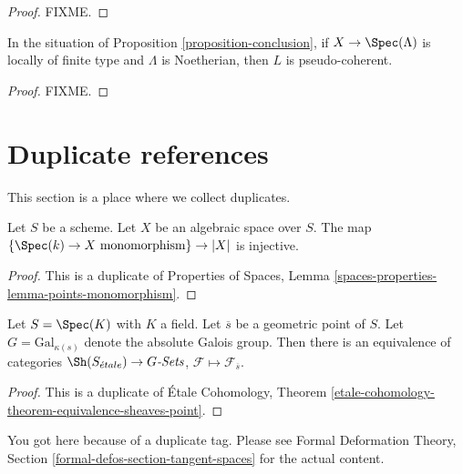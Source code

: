 \begin{proof}
FIXME.
\end{proof}

\begin{lemma}
\label{lemma-pseudo-coherent}
In the situation of Proposition \ref{proposition-conclusion}, if
$X \to \Spec(\Lambda)$ is locally of finite type and $\Lambda$ is Noetherian,
then $L$ is pseudo-coherent.
\end{lemma}

\begin{proof}
FIXME.
\end{proof}












\section{Duplicate references}
\label{section-duplicates}

\noindent
This section is a place where we collect duplicates.

\begin{lemma}
\label{lemma-points-monomorphism}
Let $S$ be a scheme. Let $X$ be an algebraic space over $S$.
The map $\{\Spec(k) \to X \text{ monomorphism}\} \to |X|$ is injective.
\end{lemma}

\begin{proof}
This is a duplicate of
Properties of Spaces, Lemma \ref{spaces-properties-lemma-points-monomorphism}.
\end{proof}

\begin{theorem}
\label{theorem-equivalence-sheaves-point}
Let $S = \Spec(K)$ with $K$ a field.
Let $\overline{s}$ be a geometric point of $S$.
Let $G = \text{Gal}_{\kappa(s)}$ denote the absolute Galois group.
Then there is an equivalence of categories
$\Sh(S_{\acute{e}tale}) \to G\textit{-Sets}$,
$\mathcal{F} \mapsto \mathcal{F}_{\overline{s}}$.
\end{theorem}

\begin{proof}
This is a duplicate of \'Etale Cohomology, Theorem
\ref{etale-cohomology-theorem-equivalence-sheaves-point}.
\end{proof}

\begin{remark}
\label{remark-tangent-spaces}
You got here because of a duplicate tag. Please see
Formal Deformation Theory, Section \ref{formal-defos-section-tangent-spaces}
for the actual content.
\end{remark}














